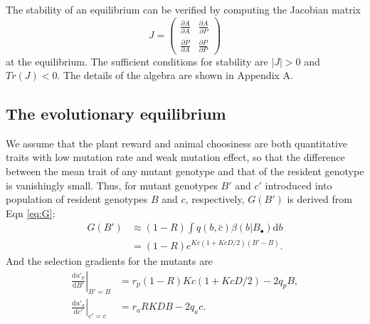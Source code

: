 \documentclass[12pt]{article}
\begin{document}
The stability of an equilibrium can be verified by computing the Jacobian matrix
\begin{equation*}
J =\begin{pmatrix}
	\frac{\partial \dot{A}}{\partial A} & \frac{\partial \dot{A}}{\partial P} \\
	\frac{\partial \dot{P}}{\partial A} & \frac{\partial \dot{P}}{\partial P}
   \end{pmatrix}
\end{equation*}
at the equilibrium. The sufficient conditions for stability are $\left|J\right|>0$ and $Tr(J)<0$. The details of the algebra are shown in Appendix A.


\subsection*{The evolutionary equilibrium}

We assume that the plant reward and animal choosiness are both quantitative traits with low mutation rate and weak mutation effect, so that the difference between the mean trait of any mutant genotype and that of the resident genotype is vanishingly small. Thus, for mutant genotypes $B'$ and $c'$ introduced into population of resident genotypes $B$ and $c$, respectively, $G(B')$ is derived from Eqn \eqref{eq:G}:
\begin{subequations}
\begin{align*}
G(B') &\approx (1-R) \int q(b,\bar{c}) \beta(b|B_\bullet) \mathrm{d}b \\
	  &= (1-R) e^{K c(1 + K c D/2)(B'-B)}.
\end{align*}
\end{subequations}
And the selection gradients for the mutants are 
\begin{subequations}
\begin{align}
\label{eq:Bgrad2}
\left.\frac{\mathrm{d} u'_p}{\mathrm{d} B'} \right|_{B' = B} &= r_p(1-R) K c(1+K c D/2) -2 q_p B , \\
\label{eq:cgrad2}
\left.\frac{\mathrm{d} u'_a}{\mathrm{d} c'}\right|_{c'=c} &= r_a R K D B -2 q_a c.
\end{align}
\end{subequations}
\end{document}
